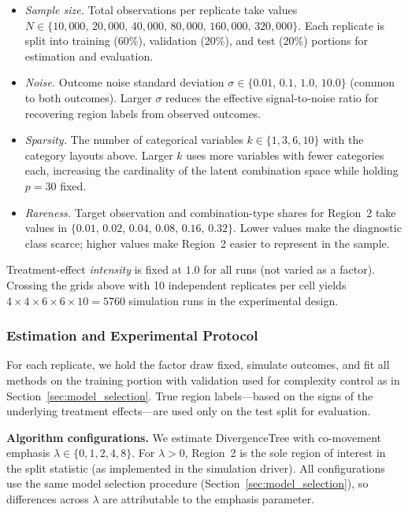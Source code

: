 \documentclass[11pt,letterpaper,english]{article}
\theoremstyle{definition}
\theoremstyle{definition}
\begin{document}
\begin{bibunit}
\begin{itemize}[leftmargin=2em]
    \item \emph{Sample size.}
    Total observations per replicate take values $N \in \{10{,}000,\,20{,}000,\,40{,}000,\,80{,}000,\,160{,}000,\,320{,}000\}$. Each replicate is split into training (60\%), validation (20\%), and test (20\%) portions for estimation and evaluation.

    \item \emph{Noise.}
    Outcome noise standard deviation $\sigma \in \{0.01,\,0.1,\,1.0,\,10.0\}$ (common to both outcomes). Larger $\sigma$ reduces the effective signal-to-noise ratio for recovering region labels from observed outcomes.

    \item \emph{Sparsity.}
    The number of categorical variables $k \in \{1,3,6,10\}$ with the category layouts above. Larger $k$ uses more variables with fewer categories each, increasing the cardinality of the latent combination space while holding $p=30$ fixed.

    \item \emph{Rareness.}
    Target observation and combination-type shares for Region~2 take values in $\{0.01,\,0.02,\,0.04,\,0.08,\,0.16,\,0.32\}$. Lower values make the diagnostic class scarce; higher values make Region~2 easier to represent in the sample.
\end{itemize}

Treatment-effect \emph{intensity} is fixed at $1.0$ for all runs (not varied as a factor). Crossing the grids above with 10 independent replicates per cell yields $4\times 4\times 6\times 6\times 10 = 5760$ simulation runs in the experimental design.

\subsubsection{Estimation and Experimental Protocol}
\label{sec:protocol}

For each replicate, we hold the factor draw fixed, simulate outcomes, and fit all methods on the training portion with validation used for complexity control as in Section~\ref{sec:model_selection}. True region labels---based on the signs of the underlying treatment effects---are used only on the test split for evaluation.

\vspace{6pt}
\noindent
\textbf{Algorithm configurations.}
We estimate DivergenceTree with co-movement emphasis $\lambda \in \{0,1,2,4,8\}$. For $\lambda>0$, Region~2 is the sole region of interest in the split statistic (as implemented in the simulation driver). All configurations use the same model selection procedure (Section~\ref{sec:model_selection}), so differences across $\lambda$ are attributable to the emphasis parameter.


\end{bibunit}
\end{document}

